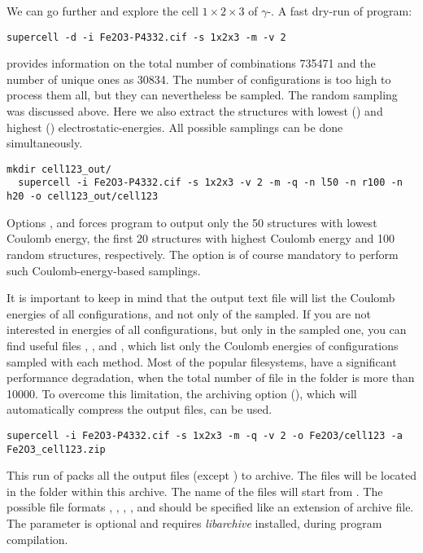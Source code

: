 \documentclass[a4paper,10pt]{article}
\begin{document}
We can go further and explore the cell $1\times2\times3$ of $\gamma$-. A fast dry-run of \sups{} program:
\begin{Verbatim}[breaklines]
  supercell -d -i Fe2O3-P4332.cif -s 1x2x3 -m -v 2 
\end{Verbatim}
provides information on the total number of combinations \num{735471} and the number of unique ones as \num{30834}. The number of configurations is too high to process them all, but they can nevertheless be sampled. The random sampling was discussed above. Here we also extract the structures with lowest () and highest () electrostatic-energies. All possible samplings can be done simultaneously. 
\begin{Verbatim}[breaklines]
  mkdir cell123_out/
  supercell -i Fe2O3-P4332.cif -s 1x2x3 -v 2 -m -q -n l50 -n r100 -n h20 -o cell123_out/cell123
\end{Verbatim}
Options ,  and  forces program to output only the 50 structures with lowest Coulomb energy, the first 20 structures with highest Coulomb energy and 100 random structures, respectively. The  option is of course mandatory to perform such Coulomb-energy-based samplings.

It is important to keep in mind that the output text file  will list the Coulomb energies of all configurations, and not only of the sampled. If you are not interested in energies of all configurations, but only in the sampled one, you can find useful files , , and , which list only the Coulomb energies of configurations sampled with each method. Most of the popular filesystems, have a significant performance degradation, when the total number of file in the folder is more than \num{10000}. To overcome this limitation, the archiving option (), which will automatically compress the output files, can be used.
\begin{Verbatim}[breaklines]
  supercell -i Fe2O3-P4332.cif -s 1x2x3 -m -q -v 2 -o Fe2O3/cell123 -a Fe2O3_cell123.zip
\end{Verbatim}
This run of \sups{} packs all the output files (except ) to  archive. The files will be located in the folder  within this archive. The name of the files will start from . The possible file formats , , , ,  and  should be specified like an extension of archive file. The parameter is optional and requires \textit{libarchive} installed, during program compilation.
\end{document}
